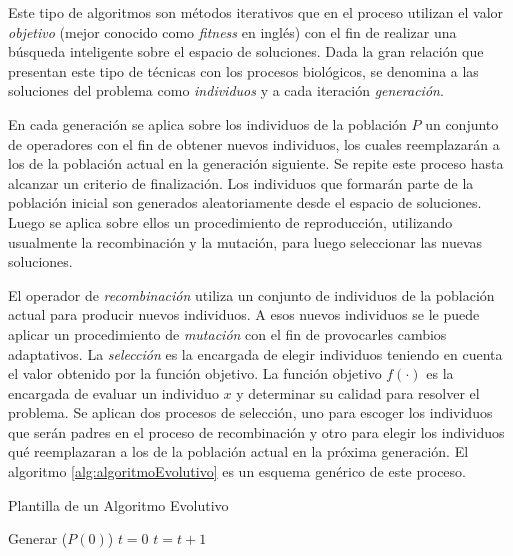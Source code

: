 Este tipo de algoritmos son métodos iterativos que en el proceso utilizan el valor \textit{objetivo} (mejor conocido como \textit{fitness} en inglés) con el fin de realizar una búsqueda inteligente sobre el espacio de soluciones. Dada la gran relación que presentan este tipo de técnicas con los procesos biológicos, se denomina a las soluciones del problema como \textit{individuos} y a cada iteración \textit{generación}.


En cada generación se aplica sobre los individuos de la población $P$ un conjunto de operadores con el fin de obtener nuevos individuos, los cuales reemplazarán a los de la población actual en la generación siguiente. Se repite este proceso hasta alcanzar un criterio de finalización. Los individuos que formarán parte de la población inicial son generados aleatoriamente desde el espacio de soluciones. Luego se aplica sobre ellos un procedimiento de reproducción, utilizando usualmente la recombinación y la mutación, para luego seleccionar las nuevas soluciones.


El operador de \textit{recombinación} utiliza un conjunto de individuos de la población actual para producir nuevos individuos. A esos nuevos individuos se le puede aplicar un procedimiento de \textit{mutación} con el fin de provocarles cambios adaptativos. La \textit{selección} es la encargada de elegir individuos teniendo en cuenta el valor obtenido por la función objetivo. La función objetivo $f(\cdot)$ es la encargada de evaluar un individuo $x$ y determinar su calidad para resolver el problema. Se aplican dos procesos de selección, uno para escoger los individuos que serán padres en el proceso de recombinación y otro para elegir los individuos qué reemplazaran a los de la población actual en la próxima generación. El algoritmo \ref{alg:algoritmoEvolutivo} es un esquema genérico de este proceso.

\begin{algorithm} [H]
    \caption{Plantilla de un Algoritmo Evolutivo} 
    \label{alg:algoritmoEvolutivo} 
    \begin{algorithmic} [1]
        \State Generar ($P(0)$)
        \State $t=0$
            \State $t=t+1$
        \EndWhile 
    \end{algorithmic}
\end{algorithm}

